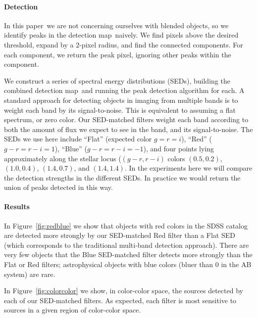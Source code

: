 \documentclass[letterpaper,preprint]{aastex62}
\newcommand{\doctype}{paper}
\newcommand{\figref}[1]{\mbox{Figure~\ref{#1}}}
\newcommand{\detmap}{detection map}
\begin{document}
\paragraph{Detection}
In this \doctype\ we are not concerning ourselves with blended
objects, so we identify peaks in the \detmap\ naively.  We find
pixels above the desired threshold, expand by a 2-pixel radius, and
find the connected components.  For each component, we return the peak
pixel, ignoring other peaks within the component.


We construct a series of spectral energy distributions (SEDs),
building the combined \detmap\ and running the peak detection
algorithm for each.  A standard approach for detecting objects in
imaging from multiple bands is to weight each band by its
signal-to-noise.  This is equivalent to assuming a flat spectrum, or
zero color.  Our SED-matched filters weight each band according to
both the amount of flux we expect to see in the band, and its
signal-to-noise.  The SEDs we use here include ``Flat'' (expected
color $g = r = i$), ``Red'' ($g-r = r-i = 1$), ``Blue'' ($g-r = r-i =
-1$), and four points lying approximately along the stellar locus
($(g-r, r-i)$ colors $(0.5,0.2)$, $(1.0,0.4)$, $(1.4,0.7)$, and
$(1.4,1.4)$.  In the experiments here we will compare the detection
strengths in the different SEDs.  In practice we would return the
union of peaks detected in this way.




\paragraph{Results}
In \figref{fig:redblue} we show that objects with red colors in the
SDSS catalog are detected more strongly by our SED-matched Red filter
than a Flat SED (which corresponds to the traditional multi-band
detection approach).  There are very few objects that the Blue
SED-matched filter detects more strongly than the Flat or Red filters;
astrophysical objects with blue colors (bluer than 0 in the AB system)
are rare.


In \figref{fig:colorcolor} we show, in color-color space, the sources
detected by each of our SED-matched filters.  As expected, each filter
is most sensitive to sources in a given region of color-color space.
\end{document}
